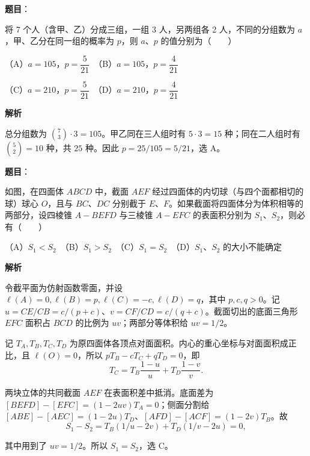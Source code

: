 \begin{answer}

\textbf{题目}：

将 7 个人（含甲、乙）分成三组，一组 3 人，另两组各 2 人，不同的分组数为 $a$，甲、乙分在同一组的概率为 $p$，则 $a\text{、}p$ 的值分别为\mbox{（　　）}

（A）$a=105\text{，}p=\dfrac5{21}$　（B）$a=105\text{，}p=\dfrac4{21}$

（C）$a=210\text{，}p=\dfrac5{21}$　（D）$a=210\text{，}p=\dfrac4{21}$

\textbf{解析}

总分组数为 $\binom73\cdot3=105$。甲乙同在三人组时有 $5\cdot3=15$ 种；同在二人组时有 $\binom52=10$ 种，共 $25$ 种。因此 $p=25/105=5/21$，选 A。


\end{answer}
\begin{answer}

\textbf{题目}：

如图，在四面体 $ABCD$ 中，截面 $AEF$ 经过四面体的内切球（与四个面都相切的球）球心 $O$，且与 $BC\text{、}DC$ 分别截于 $E\text{、}F$。如果截面将四面体分为体积相等的两部分，设四棱锥 $A-BEFD$ 与三棱锥 $A-EFC$ 的表面积分别为 $S_1\text{、}S_2$，则必有\mbox{（　　）}

（A）$S_1<S_2$　（B）$S_1>S_2$　（C）$S_1=S_2$　（D）$S_1\text{、}S_2$ 的大小不能确定
\nopagebreak[4]
\begin{center}\end{center}
\nopagebreak[4]
\textbf{解析}

令截平面为仿射函数零面，并设 $\ell(A)=0,\ell(B)=p,\ell(C)=-c,\ell(D)=q$，其中 $p,c,q>0$。记 $u=CE/CB=c/(p+c)$、$v=CF/CD=c/(q+c)$。截面切出的底面三角形 $EFC$ 面积占 $BCD$ 的比例为 $uv$；两部分等体积给 $uv=1/2$。

记 $T_A,T_B,T_C,T_D$ 为原四面体各顶点对面面积。内心的重心坐标与对面面积成正比，且 $\ell(O)=0$，所以 $pT_B-cT_C+qT_D=0$，即
\nopagebreak[4]
\[
T_C=T_B\frac{1-u}{u}+T_D\frac{1-v}{v}.
\]

两块立体的共同截面 $AEF$ 在表面积差中抵消。底面差为 $[BEFD]-[EFC]=(1-2uv)T_A=0$；侧面分割给 $[ABE]-[AEC]=(1-2u)T_D$、$[AFD]-[ACF]=(1-2v)T_B$。故
\nopagebreak[4]
\[
S_1-S_2=T_B(1/u-2v)+T_D(1/v-2u)=0,
\]

其中用到了 $uv=1/2$。所以 $S_1=S_2$，选 C。


\end{answer}
